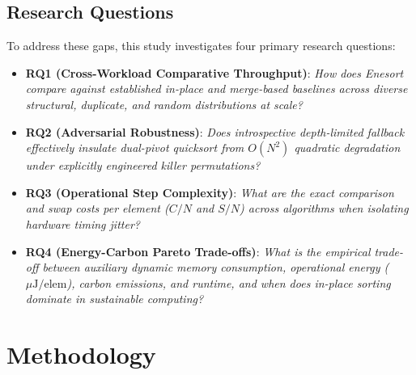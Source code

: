 \documentclass[journal]{IEEEtran}
\begin{document}
\subsection{Research Questions}
To address these gaps, this study investigates four primary research questions:
\begin{itemize}
    \item \textbf{RQ1 (Cross-Workload Comparative Throughput)}: \textit{How does Enesort compare against established in-place and merge-based baselines across diverse structural, duplicate, and random distributions at scale?}
    \item \textbf{RQ2 (Adversarial Robustness)}: \textit{Does introspective depth-limited fallback effectively insulate dual-pivot quicksort from $O(N^2)$ quadratic degradation under explicitly engineered killer permutations?}
    \item \textbf{RQ3 (Operational Step Complexity)}: \textit{What are the exact comparison and swap costs per element ($C/N$ and $S/N$) across algorithms when isolating hardware timing jitter?}
    \item \textbf{RQ4 (Energy-Carbon Pareto Trade-offs)}: \textit{What is the empirical trade-off between auxiliary dynamic memory consumption, operational energy ($\mu\text{J}/\text{elem}$), carbon emissions, and runtime, and when does in-place sorting dominate in sustainable computing?}
\end{itemize}

\section{Methodology}
\end{document}
